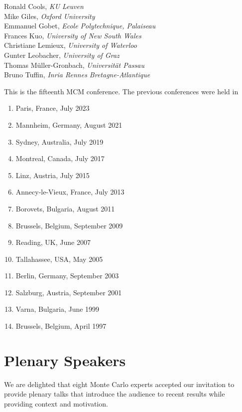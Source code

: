 \documentclass[12pt,lettersize,oneside]{book} %
\begin{document}
Ronald Cools, \emph{KU Leuven} \\
Mike Giles, \emph{Oxford University} \\
Emmanuel Gobet, \emph{Ecole Polytechnique, Palaiseau} \\
Frances Kuo, \emph{University of New South Wales} \\
Christiane Lemieux, \emph{University of Waterloo} \\
Gunter Leobacher, \emph{University of Graz} \\
Thomas Müller-Gronbach, \emph{Universität Passau} \\
Bruno Tuffin, \emph{Inria Rennes Bretagne-Atlantique}


This is the fifteenth MCM conference.  The previous  conferences were held in
\begin{enumerate}
\item Paris, France, July 2023
\item Mannheim, Germany, August 2021
\item Sydney, Australia, July 2019
\item Montreal, Canada, July 2017
\item Linz, Austria, July 2015
\item Annecy-le-Vieux, France, July 2013
\item Borovets, Bulgaria, August 2011
\item Brussels, Belgium, September 2009
\item Reading, UK, June 2007
\item Tallahassee, USA, May 2005
\item Berlin, Germany, September 2003
\item Salzburg, Austria, September 2001
\item Varna, Bulgaria, June 1999
\item Brussels, Belgium, April 1997
\end{enumerate}

\section{Plenary Speakers} \label{plenary_speakers}

We are delighted that eight Monte Carlo experts accepted our invitation to provide plenary talks that introduce the audience to recent results while providing context and motivation.


\end{document}
